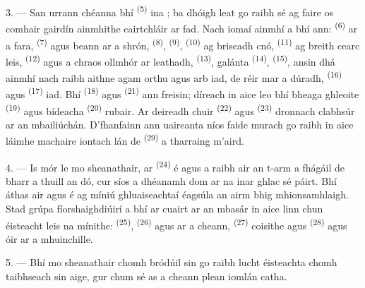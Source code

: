 3. --- San urrann chéanna bhí  \textsuperscript{(5)} ina
; ba dhóigh leat go raibh sé ag faire os comhair gairdín
ainmhithe cairtchláir ar fad. Nach iomaí ainmhí a bhí ann: 
\textsuperscript{(6)} ar a fara,  \textsuperscript{(7)} agus
beann ar a shrón,  \textsuperscript{(8)}, 
\textsuperscript{(9)},  \textsuperscript{(10)} ag briseadh cnó,
 \textsuperscript{(11)} ag breith cearc leis, 
\textsuperscript{(12)} agus a chraos ollmhór ar leathadh, 
\textsuperscript{(13)},  galánta \textsuperscript{(14)},
 \textsuperscript{(15)}, ansin dhá ainmhí nach raibh aithne agam orthu
agus arb iad, de réir mar a dúradh,  \textsuperscript{(16)} agus
 \textsuperscript{(17)} iad. Bhí 
\textsuperscript{(18)} agus  \textsuperscript{(21)} ann freisin;
díreach in aice leo bhí  bheaga ghleoite \textsuperscript{(19)}
agus  bídeacha \textsuperscript{(20)} rubair. Ar deireadh chuir
 \textsuperscript{(22)} agus 
\textsuperscript{(23)} dronnach clabhsúr ar an mbailiúchán. D'fhanfainn ann uaireanta
níos faide murach go raibh in aice láimhe machaire iontach lán de  \textsuperscript{(29)} a tharraing m'aird.

\VUsaut{4.0mm}
\VUsaut{2.8mm}

4. --- Is mór le mo sheanathair, ar  \textsuperscript{(24)} é agus a
raibh air an t-arm a fhágáil de bharr  a thuill an
 dó, cur síos a dhéanamh dom ar na  inar
ghlac sé páirt. Bhí áthas air agus é ag míniú ghluaiseachtaí éagsúla an airm bhig
mhionsamhlaigh. Stad grúpa fíorshaighdiúirí a bhí ar cuairt ar an mbasár in aice
linn chun éisteacht leis na mínithe: 
\textsuperscript{(25)},  \textsuperscript{(26)} agus
 ar a cheann,  \textsuperscript{(27)} coisithe
agus  \textsuperscript{(28)} agus  óir ar a
mhuinchille.

5. --- Bhí mo sheanathair chomh bródúil sin go raibh lucht éisteachta chomh
taibhseach sin aige, gur chum sé as a cheann plean iomlán catha.

